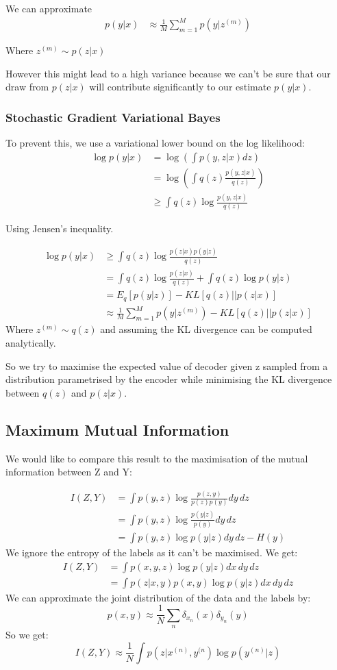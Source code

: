 \documentclass[10pt,oneside,openright]{report}
\begin{document}
We can approximate
\begin{align}
 p(y|x) &\approx \frac{1}{M} \sum^M_{m=1} p(y | z^{(m)}) 
\end{align}

Where $ z^{(m)} \sim p(z|x) $

However this might lead to a high variance because we can't be sure that our draw from $p(z | x)$ will contribute significantly to our estimate $p(y |x)$.

\subsubsection{Stochastic Gradient Variational Bayes}

To prevent this, we use a variational lower bound on the log likelihood:
\begin{align}
 \log p(y|x) &= \log(\int p(y, z|x) dz) \\
 & =  \log(\int q(z) \frac{p(y, z|x)}{q(z)}) \\
 & \geq \int q(z) \log \frac{p(y, z|x)}{q(z)}
\end{align}

Using Jensen's inequality.

\begin{align}
 \log p(y|x) & \geq \int q(z) \log \frac{p(z|x) p(y| z)}{q(z)} \\
  &= \int q(z) \log \frac{p(z|x)}{q(z)}  + \int q(z) \log p(y|z) \\
  &= E_q[p(y|z)] - KL[q(z) || p(z|x)]\\
  &\approx  \frac{1}{M} \sum^M_{m=1} p(y | z^{(m)}) - KL[q(z) || p(z|x)]
\end{align}
Where $ z^{(m)} \sim q(z)$ and assuming the KL divergence can be computed analytically.

So we try to maximise the expected value of decoder given z sampled from a distribution parametrised by the encoder while minimising the KL divergence between $q(z)$ and $p(z|x)$.

\subsection{Maximum Mutual Information}

We would like to compare this result to the maximisation of the  mutual information between Z and Y:

\begin{align}
I(Z, Y) &= \int p(y, z) \log \frac{p(z, y)}{p(z)p(y)} dy\,dz\\
& = \int p(y, z) \log \frac{p(y|z)}{p(y)} dy\,dz\\
&= \int p(y, z) \log p(y|z) dy\,dz - H(y) 
\end{align}
We ignore the entropy of the labels as it can't be maximised. We get:
\begin{align}
I(Z, Y) &= \int p(x, y, z) \log p(y| z) dx\,dy\,dz\\
&= \int p(z | x, y) p(x, y) \log p(y | z) dx\,dy\,dz
\end{align}
We can approximate the joint distribution of the data and the labels by:
$$ p(x, y) \approx \frac{1}{N}\sum_n \delta_{x_n}(x) \delta_{y_n}(y)$$
So we get:
$$ I(Z, Y) \approx \frac{1}{N} \int p(z | x^{(n)}, y^{(n}) \log p(y^{(n)} | z) $$
\end{document}
